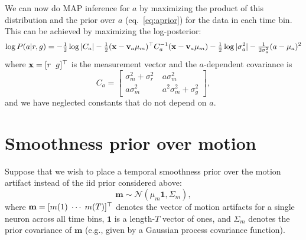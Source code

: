 \documentclass[11pt]{article}
\renewcommand{\eqref}[1]{eq.~\ref{eq:#1}}
\newcommand{\vr}{\sigma^2_r}
\newcommand{\vm}{\sigma^2_m}
\newcommand{\vg}{\sigma^2_g}
\newcommand{\va}{\sigma^2_a}
\newcommand{\vecv}{\mathbf{v}}
\newcommand{\vecm}{\mathbf{m}}
\newcommand{\vx}{\mathbf{x}}
\newcommand{\vones}{\mathbf{1}}
\begin{document}
We can now do MAP inference for $a$ by maximizing the product of this
distribution and the prior over $a$ (\eqref{aprior}) for the data in
each time bin. This can be achieved by maximizing the log-posterior:
\begin{equation}
\log P(a|r,g) = -\tonehlf \log | C_a| - \tonehlf (\vx - \vecv_a \mu_m)\trp
C_a\inv (\vx-\vecv_a\mu_m) 
- \tonehlf \log |\va| - \tfrac{1}{2\va} (a-\mu_a)^2
\end{equation}
where $\vx = [r\;\; g]\trp$ is the measurement vector and the
$a$-dependent 
covariance is
\begin{equation}
C_a = 
\begin{bmatrix}
  \vm  + \vr \ &  a\vm  \\
a\vm & a^2\vm + \vg
\end{bmatrix},
\end{equation}
and we have neglected constants that do not depend on $a$.




\section{Smoothness prior over motion}

Suppose that we wish to place a temporal smoothness prior over the motion 
artifact instead of the iid prior considered above:
\begin{equation} \label{eq:mprior}
\vecm \sim\mathcal{N}(\mu_m \vones,\Sigma_m),  
\end{equation}
where $\vecm = [m(1)\; \cdots\; m(T)]\trp$ denotes the vector of
motion artifacts for a single neuron across all time bins, $\vones$ is
a length-$T$ vector of ones, and $\Sigma_m$ denotes the prior
covariance of $\vecm$ (e.g., given by a Gaussian process covariance
function).
\end{document}
